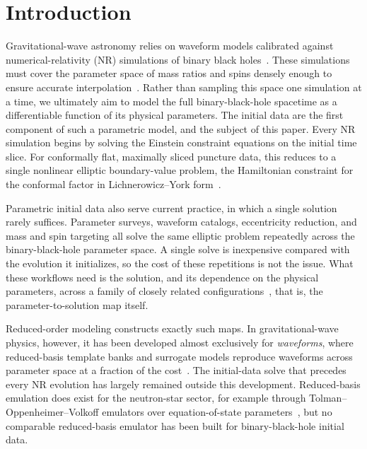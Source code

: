 \documentclass[
  aps,
  prd,
  twocolumn,
  10pt,
  amsmath,
  amssymb,
  nofootinbib,
  superscriptaddress,
  floatfix,
]{revtex4-2}
\newif\ifshowreferee \showrefereetrue
\newcommand{\refereetext}[1]{\ifshowreferee{\color{refereepurple}#1}\else#1\fi}
\begin{document}
\maketitle

\section{Introduction}
\label{sec:intro}
Gravitational-wave astronomy relies on waveform models calibrated against numerical-relativity (NR) simulations of binary black holes~\cite{Pompili2023,Pratten2020,Varma2019}.
These simulations must cover the parameter space of mass ratios and spins densely enough to ensure accurate interpolation~\cite{Scheel2025}.
\refereetext{Rather than sampling this space one simulation at a time, we ultimately aim to model the full binary-black-hole spacetime as a differentiable function of its physical parameters.}
\refereetext{The initial data are the first component of such a parametric model, and the subject of this paper.}
Every NR simulation begins by solving the Einstein constraint equations on the initial time slice.
For conformally flat, maximally sliced puncture data, this reduces to a single nonlinear elliptic boundary-value problem, the Hamiltonian constraint for the conformal factor in Lichnerowicz--York form~\cite{York1979,BowenYork1980,BrandtBruegmann1997,Cook2000}.


\refereetext{Parametric initial data also serve current practice, in which a single solution rarely suffices.}
\refereetext{Parameter surveys, waveform catalogs, eccentricity reduction, and mass and spin targeting all solve the same elliptic problem repeatedly across the binary-black-hole parameter space.}
\refereetext{A single solve is inexpensive compared with the evolution it initializes, so the cost of these repetitions is not the issue.}
\refereetext{What these workflows need is the solution, and its dependence on the physical parameters, across a family of closely related configurations~\cite{Mendes2025}, that is, the parameter-to-solution map itself.}


\refereetext{Reduced-order modeling constructs exactly such maps.}
In gravitational-wave physics, however, it has been developed almost exclusively for \emph{waveforms}, where reduced-basis template banks and surrogate models reproduce waveforms across para\-meter space at a fraction of the cost~\cite{FieldGalley2011,Field2014,Blackman2015,Varma2019}.
The initial-data solve that precedes every NR evolution has largely remained outside this development.
Reduced-basis emulation does exist for the neutron-star sector, for example through Tolman--Oppenheimer--Volkoff emulators over equation-of-state parameters~\cite{Reed2024}, but no comparable reduced-basis emulator has been built for binary-black-hole initial data.
\end{document}

